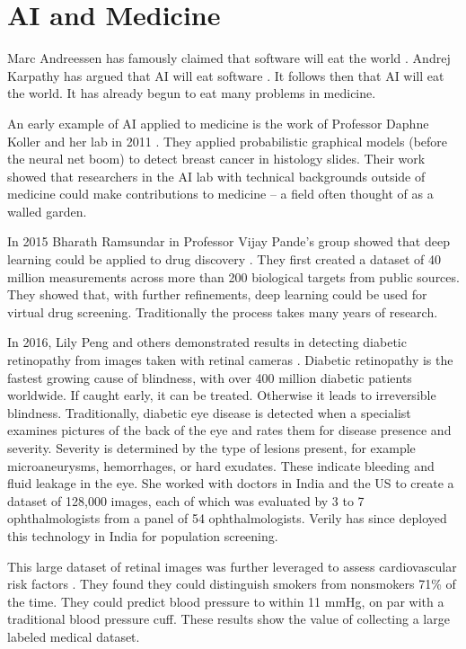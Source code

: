 \chapter{AI and Medicine}

Marc Andreessen has famously claimed that software will eat the world \cite{andreessen2011software}.  Andrej Karpathy has argued that AI will eat software \cite{karpathy2017software}.  It follows then that AI will eat the world.  It has already begun to eat many problems in medicine.

An early example of AI applied to medicine is the work of Professor Daphne Koller and her lab in 2011 \cite{beck2011systematic}.  They applied probabilistic graphical models (before the neural net boom) to detect breast cancer in histology slides.  Their work showed that researchers in the AI lab with technical backgrounds outside of medicine could make contributions to medicine -- a field often thought of as a walled garden.  

In 2015 Bharath Ramsundar in Professor Vijay Pande's group showed that deep learning could be applied to drug discovery \cite{ramsundar2015massively}.  They first created a dataset of 40 million measurements across more than 200 biological targets from public sources.  They showed that, with further refinements, deep learning could be used for virtual drug screening.  Traditionally the process takes many years of research.

In 2016, Lily Peng and others demonstrated results in detecting diabetic retinopathy from images taken with retinal cameras \cite{gulshan2016development}.  Diabetic retinopathy is the fastest growing cause of blindness, with over 400 million diabetic patients worldwide.  If caught early, it can be treated.  Otherwise it leads to irreversible blindness.  Traditionally, diabetic eye disease is detected when a specialist examines pictures of the back of the eye and rates them for disease presence and severity. Severity is determined by the type of lesions present, for example microaneurysms, hemorrhages, or hard exudates.  These indicate bleeding and fluid leakage in the eye.  She worked with doctors in India and the US to create a dataset of 128,000 images, each of which was evaluated by 3 to 7 ophthalmologists from a panel of 54 ophthalmologists.  Verily has since deployed this technology in India for population screening.

This large dataset of retinal images was further leveraged to assess cardiovascular risk factors \cite{poplin2018prediction}.  They found they could distinguish smokers from nonsmokers 71\% of the time.  They could predict blood pressure to within 11 mmHg, on par with a traditional blood pressure cuff.  These results show the value of collecting a large labeled medical dataset.

